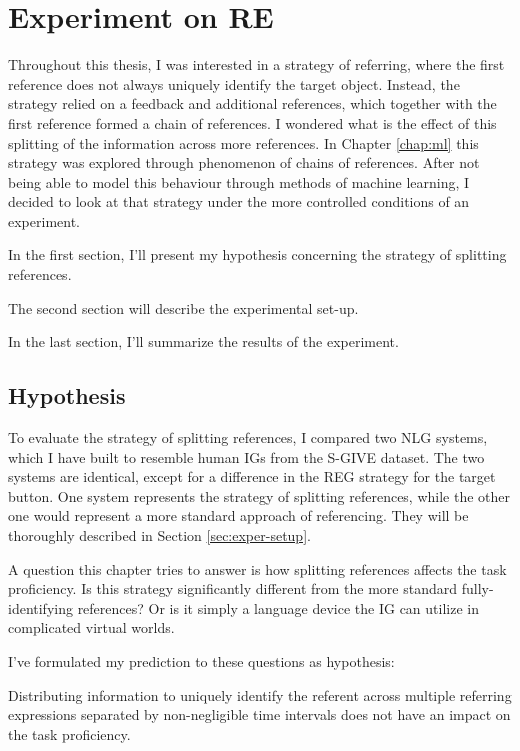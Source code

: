 \chapter{Experiment on RE}
Throughout this thesis, I was interested in a strategy of referring, where the first reference does not always uniquely identify the target object. Instead, the strategy relied on a feedback and additional references, which together with the first reference formed a chain of references. I wondered what is the effect of this splitting of the information across more references. In Chapter \ref{chap:ml} this strategy was explored through phenomenon of chains of references. After not being able to model this behaviour through methods of machine learning, I decided to look at that strategy under the more controlled conditions of an experiment.

In the first section, I'll present my hypothesis concerning the strategy of splitting references. 

The second section will describe the experimental set-up. 

In the last section, I'll summarize the results of the experiment.

\section{Hypothesis}
To evaluate the strategy of splitting references, I compared two NLG systems, which I have built to resemble human IGs from the S-GIVE dataset. The two systems are identical, except for a difference in the REG strategy for the target button. One system represents the strategy of splitting references, while the other one would represent a more standard approach of referencing. They will be thoroughly described in Section \ref{sec:exper-setup}.

A question this chapter tries to answer is how splitting references affects the task proficiency. Is this strategy significantly different from the more standard fully-identifying references? Or is it simply a language device the IG can utilize in complicated virtual worlds.

I've formulated my prediction to these questions as hypothesis:

\begin{hypo}
Distributing information to uniquely identify the referent across multiple referring expressions separated by non-negligible time intervals does not have an impact on the task proficiency.
\end{hypo}

